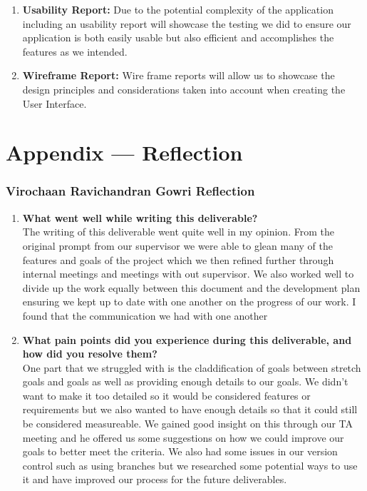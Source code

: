 \documentclass{article}
\begin{document}
\begin{enumerate}
    \item \textbf{Usability Report:} Due to the potential complexity of the application including an usability report will showcase the testing we did to ensure our application is both easily usable but also efficient and accomplishes the features as we intended.
    \item \textbf{Wireframe Report:} Wire frame reports will allow us to showcase the design principles and considerations taken into account when creating the User Interface.
\end{enumerate} 

\newpage{}

\section*{Appendix --- Reflection}


% 

\subsubsection*{Virochaan Ravichandran Gowri Reflection}
\begin{enumerate}
    \item \textbf{What went well while writing this deliverable? } \\
    The writing of this deliverable went quite well in my opinion. From the original prompt from our supervisor we were able to glean many of the features and goals of the project which we then refined further through internal meetings and meetings with out supervisor. We also worked well to divide up the work equally between this document and the development plan ensuring we kept up to date with one another on the progress of our work. I found that the communication we had with one another 
    \item \textbf{What pain points did you experience during this deliverable, and how did you resolve them?} \\ 
    One part that we struggled with is the claddification of goals between stretch goals and goals as well as providing enough details to our goals. We didn't want to make it too detailed so it would be considered features or requirements but we also wanted to have enough details so that it could still be considered measureable. We gained good insight on this through our TA meeting and he offered us some suggestions on how we could improve our goals to better meet the criteria. We also had some issues in our version control such as using branches but we researched some potential ways to use it and have improved our process for the future deliverables.
    
\end{enumerate} 
\end{document}
